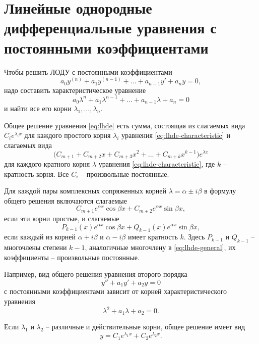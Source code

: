 \documentclass[a5paper, 11pt]{extbook}
\theoremstyle{definition}
\theoremstyle{definition}
\theoremstyle{definition}
\begin{document}
\section{Линейные однородные дифференциальные уравнения с постоянными коэффициентами}

Чтобы решить ЛОДУ с постоянными коэффициентами
\begin{equation}
    \label{eq:lhde}
    a_0 y^{(n)} + a_1 y^{(n - 1)} + \ldots + a_{n - 1} y' + a_n y = 0,
\end{equation}
надо составить характеристическое уравнение
\begin{equation}
    \label{eq:lhde-characteristic}
    a_0 \lambda^n + a_1 \lambda^{n - 1} + \ldots + a_{n - 1} \lambda + a_n = 0
\end{equation}
и найти все его корни \(\lambda_1, \ldots, \lambda_n\).

Общее решение уравнения \eqref{eq:lhde} есть сумма, состоящая из слагаемых вида \(C_i e^{\lambda_i x}\) для каждого простого корня \(\lambda_i\) уравнения \eqref{eq:lhde-characteristic} и слагаемых вида
\begin{equation}
    \label{eq:lhde-general}
    \big( C_{m + 1} + C_{m + 2}x + C_{m + 3}x^2 + \ldots + C_{m + k} x^{k - 1} \big) e^{\lambda x}
\end{equation}
для каждого кратного корня \(\lambda\) уравнения \eqref{eq:lhde-characteristic}, где \(k\) -- кратность корня. Все \(C_i\) -- произвольные постоянные.

Для каждой пары комплексных сопряженных корней \(\lambda = \alpha \pm i \beta\) в формулу общего решения включаются слагаемые
\[
    C_{m + 1} e^{\alpha x} \cos \beta x + C_{m + 2} e^{\alpha x} \sin \beta x,
\]
если эти корни простые, и слагаемые
\[
    P_{k - 1}(x) e^{\alpha x} \cos{\beta x} + Q_{k - 1}(x) e^{\alpha x} \sin{\beta x},
\]
если каждый из корней \(\alpha + i \beta\) и \(\alpha - i \beta\) имеет кратность \(k\). Здесь \(P_{k - 1}\) и \(Q_{k - 1}\) -- многочлены степени \(k - 1\), аналогичные многочлену в \eqref{eq:lhde-general}, их коэффициенты -- произвольные постоянные.

Например, вид общего решения уравнения второго порядка
\[
    y'' + a_1 y' + a_2 y = 0
\]
с постоянными коэффициентами зависит от корней характеристического уравнения
\[
    \lambda^2 + a_1 \lambda + a_2 = 0.
\]

Если \(\lambda_1\) и \(\lambda_2\) -- различные и действительные корни, общее решение имеет вид
\[
    y = C_1 e^{\lambda_1 x} + C_2 e^{\lambda_2 x}.
\]
\end{document}
